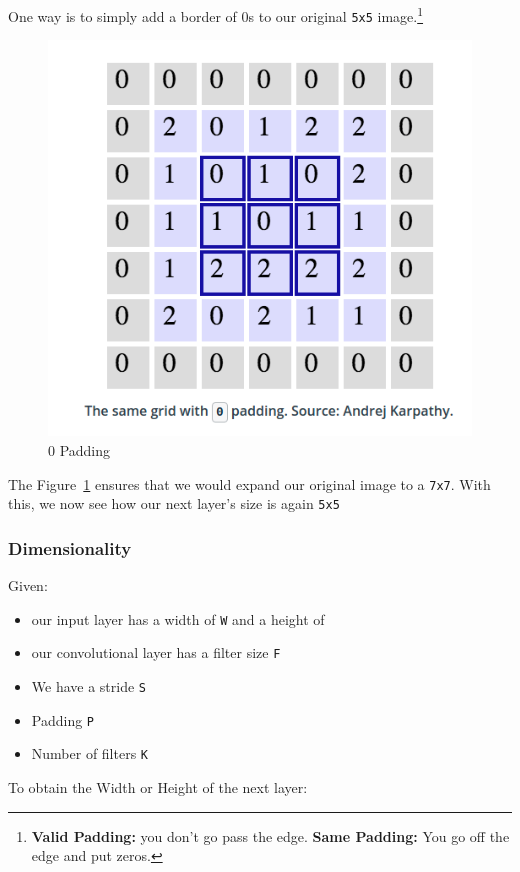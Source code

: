\documentclass[11pt, a4paper]{article}
\begin{document}
One way is to simply add a border of 0s to our original \texttt{5x5} image.\footnote{ \textbf{Valid Padding:} you don't go pass the edge. \textbf{Same Padding:} You go off the edge and put zeros.}


\begin{figure}[htb!]
	\centering
	\includegraphics[width=0.8\linewidth]{0_padding}
	\caption{0 Padding}
	\label{fig:0_padding}
\end{figure}



The Figure~\ref{fig:0_padding} ensures that we would expand our original image to a \texttt{7x7}. With this, we now see how our next layer's size is again \texttt{5x5} 


\subsubsection{Dimensionality}%
\label{ssub:dimensionality}

Given:

\begin{itemize}
	\item our input layer has a width of \texttt{W} and a height of \texttt{} 
	\item our convolutional layer has a filter size \texttt{F} 
	\item We have a stride \texttt{S} 
	\item Padding \texttt{P} 
	\item Number of filters \texttt{K} 
\end{itemize}


To obtain the Width or Height of the next layer:
\end{document}
